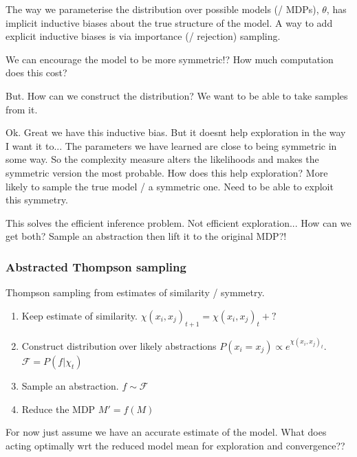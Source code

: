 The way we parameterise the distribution over possible models (/ MDPs), $\theta$, has implicit inductive biases about the true structure of the model.
A way to add explicit inductive biases is via importance (/ rejection) sampling.

We can encourage the model to be more symmetric!?
How much computation does this cost?

But. How can we construct the distribution? We want to be able to take samples
from it.

Ok. Great we have this inductive bias. But it doesnt help exploration in the way I want it to...
The parameters we have learned are close to being symmetric in some way. So the complexity measure alters the likelihoods and makes the symmetric version the most probable.
How does this help exploration? More likely to sample the true model / a symmetric one. Need to be able to exploit this symmetry.

This solves the efficient inference problem. Not efficient exploration... How can we get both?
Sample an abstraction then lift it to the original MDP?!


\subsubsection{Abstracted Thompson sampling}

Thompson sampling from estimates of similarity / symmetry.
\begin{enumerate}
	\tightlist
	\item Keep estimate of similarity. $\chi(x_i, x_j)_{t+1} = \chi(x_i, x_j)_t + ?$
	\item Construct distribution over likely abstractions $P(x_i = x_j) \propto e^{\chi(x_i, x_j)_t}$. $\mathcal F = P(f|\chi_t)$
	\item Sample an abstraction. $f\sim \mathcal F$
	\item Reduce the MDP $M' = f(M)$
\end{enumerate}

For now just assume we have an accurate estimate of the model.
What does acting optimally wrt the reduced model mean for exploration and convergence??



